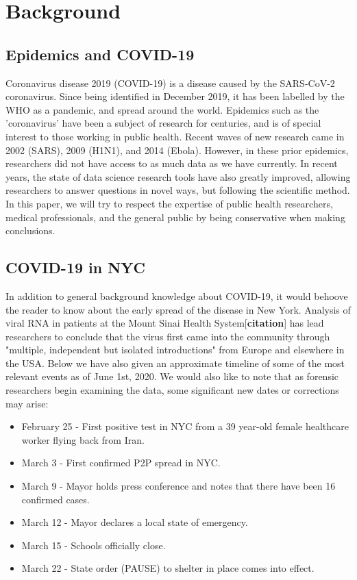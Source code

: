 \documentclass[12pt, a4, epsf] {article}
\theoremstyle{plain}
\theoremstyle{definition}
\begin{document}
\section*{Background}
\subsection*{Epidemics and COVID-19}
Coronavirus disease 2019 (COVID-19) is a disease caused by the SARS-CoV-2 coronavirus. Since being identified in December 2019, it has been labelled by the WHO as a pandemic, and spread around the world. Epidemics such as the 'coronavirus' have been a subject of research for centuries, and is of special interest to those working in public health. Recent waves of new research came in 2002 (SARS), 2009 (H1N1), and 2014 (Ebola). However, in these prior epidemics, researchers did not have access to as much data as we have currently. In recent years, the state of data science research tools have also greatly improved, allowing researchers to answer questions in novel ways, but following the scientific method. In this paper, we will try to respect the expertise of public health researchers, medical professionals, and the general public by being conservative when making conclusions.

\subsection*{COVID-19 in NYC}
In addition to general background knowledge about COVID-19, it would behoove the reader to know about the early spread of the disease in New York. Analysis of viral RNA in patients at the Mount Sinai Health System[\textbf{citation}] has lead researchers to conclude that the virus first came into the community through "multiple, independent but isolated introductions" from Europe and elsewhere in the USA. Below we have also given an approximate timeline of some of the most relevant events as of June 1st, 2020. We would also like to note that as forensic researchers begin examining the data, some significant new dates or corrections may arise:\\ 
\begin{itemize}
	\item February 25 - First positive test in NYC from a 39 year-old female healthcare worker flying back from Iran.
	\item March 3 - First confirmed P2P spread in NYC.
	\item March 9 - Mayor holds press conference and notes that there have been 16 confirmed cases.
	\item March 12 - Mayor declares a local state of emergency.
	\item March 15 - Schools officially close.
	\item March 22 - State order (PAUSE) to shelter in place comes into effect.
\end{itemize}
\end{document}
